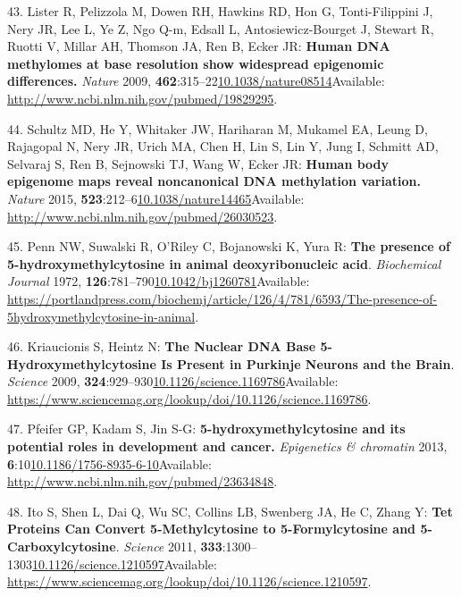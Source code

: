 \documentclass[
]{book}
\begin{document}
\leavevmode\hypertarget{ref-Lister2009}{}%
43. Lister R, Pelizzola M, Dowen RH, Hawkins RD, Hon G, Tonti-Filippini J, Nery JR, Lee L, Ye Z, Ngo Q-m, Edsall L, Antosiewicz-Bourget J, Stewart R, Ruotti V, Millar AH, Thomson JA, Ren B, Ecker JR: \textbf{Human DNA methylomes at base resolution show widespread epigenomic differences.} \emph{Nature} 2009, \textbf{462}:315--22\href{https://doi.org/10.1038/nature08514}{10.1038/nature08514}Available: \url{http://www.ncbi.nlm.nih.gov/pubmed/19829295}.

\leavevmode\hypertarget{ref-Schultz2015}{}%
44. Schultz MD, He Y, Whitaker JW, Hariharan M, Mukamel EA, Leung D, Rajagopal N, Nery JR, Urich MA, Chen H, Lin S, Lin Y, Jung I, Schmitt AD, Selvaraj S, Ren B, Sejnowski TJ, Wang W, Ecker JR: \textbf{Human body epigenome maps reveal noncanonical DNA methylation variation.} \emph{Nature} 2015, \textbf{523}:212--6\href{https://doi.org/10.1038/nature14465}{10.1038/nature14465}Available: \url{http://www.ncbi.nlm.nih.gov/pubmed/26030523}.

\leavevmode\hypertarget{ref-Penn1972}{}%
45. Penn NW, Suwalski R, O'Riley C, Bojanowski K, Yura R: \textbf{The presence of 5-hydroxymethylcytosine in animal deoxyribonucleic acid}. \emph{Biochemical Journal} 1972, \textbf{126}:781--790\href{https://doi.org/10.1042/bj1260781}{10.1042/bj1260781}Available: \url{https://portlandpress.com/biochemj/article/126/4/781/6593/The-presence-of-5hydroxymethylcytosine-in-animal}.

\leavevmode\hypertarget{ref-Kriaucionis2009}{}%
46. Kriaucionis S, Heintz N: \textbf{The Nuclear DNA Base 5-Hydroxymethylcytosine Is Present in Purkinje Neurons and the Brain}. \emph{Science} 2009, \textbf{324}:929--930\href{https://doi.org/10.1126/science.1169786}{10.1126/science.1169786}Available: \url{https://www.sciencemag.org/lookup/doi/10.1126/science.1169786}.

\leavevmode\hypertarget{ref-Pfeifer2013}{}%
47. Pfeifer GP, Kadam S, Jin S-G: \textbf{5-hydroxymethylcytosine and its potential roles in development and cancer.} \emph{Epigenetics \& chromatin} 2013, \textbf{6}:10\href{https://doi.org/10.1186/1756-8935-6-10}{10.1186/1756-8935-6-10}Available: \url{http://www.ncbi.nlm.nih.gov/pubmed/23634848}.

\leavevmode\hypertarget{ref-Ito2011}{}%
48. Ito S, Shen L, Dai Q, Wu SC, Collins LB, Swenberg JA, He C, Zhang Y: \textbf{Tet Proteins Can Convert 5-Methylcytosine to 5-Formylcytosine and 5-Carboxylcytosine}. \emph{Science} 2011, \textbf{333}:1300--1303\href{https://doi.org/10.1126/science.1210597}{10.1126/science.1210597}Available: \url{https://www.sciencemag.org/lookup/doi/10.1126/science.1210597}.
\end{document}

